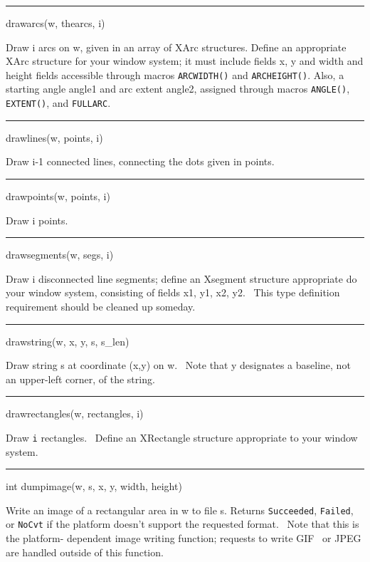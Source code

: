 {\sffamily\bfseries
\bigskip\hrule\vspace{0.1cm}
\noindent
drawarcs(w, thearcs, i)}


Draw i arcs on w, given in an array of XArc structures. Define an
appropriate XArc structure for your window system; it must include
fields x, y and width and height fields accessible through macros
\texttt{ARCWIDTH()} and \texttt{ARCHEIGHT()}. Also, a starting angle
angle1 and arc extent angle2, assigned through macros
\texttt{ANGLE()}, \texttt{EXTENT()}, and \texttt{FULLARC}.


{\sffamily\bfseries
\bigskip\hrule\vspace{0.1cm}
\noindent
drawlines(w, points, i)}


Draw i-1 connected lines, connecting the dots given in points.


{\sffamily\bfseries
\bigskip\hrule\vspace{0.1cm}
\noindent
drawpoints(w, points, i)}


Draw i points.


{\sffamily\bfseries
\bigskip\hrule\vspace{0.1cm}
\noindent
drawsegments(w, segs, i)}


Draw i disconnected line segments; define an Xsegment structure appropriate do your window system, consisting of fields
x1, y1, x2, y2. \ This type definition requirement should be cleaned up someday.


{\sffamily\bfseries
\bigskip\hrule\vspace{0.1cm}
\noindent
drawstring(w, x, y, s, s\_len)}


Draw string s at coordinate (x,y) on w. \ Note that y designates a baseline, not an upper-left corner, of the string.


{\sffamily\bfseries
\bigskip\hrule\vspace{0.1cm}
\noindent
drawrectangles(w, rectangles, i)}


Draw \texttt{i} rectangles. \ Define an XRectangle structure appropriate to your window system.

\bigskip\hrule\vspace{0.1cm}
\noindent



int dumpimage(w, s, x, y, width, height)


Write an image of a rectangular area in w to file s. Returns \texttt{Succeeded}, \texttt{Failed}, or \texttt{NoCvt} if
the platform doesn't support the requested format. \ Note that this is the {\textquotedbl}platform- dependent image
writing function{\textquotedbl}; requests to write GIF \ or JPEG are handled outside of this function.


